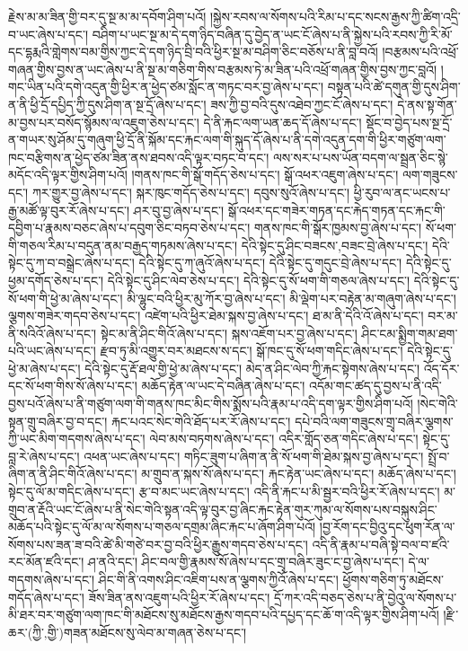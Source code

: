 རྗེས་མ་མ་ཟིན་གྱི་བར་དུ་སྔ་མ་མ་དབོག་ཤིག་པའོ། །སྐྱེས་རབས་ལ་སོགས་པའི་རིམ་པ་དང་སངས་རྒྱས་ཀྱི་ཚིག་འདྲི་བ་ཡང་ཞེས་པ་དང་། བཤིག་པ་ཡང་སྔ་མ་དེ་དག་ཉིད་བཞིན་དུ་བྱེད་ན་ཡང་ངོ་ཞེས་པ་ནི་སྐྱེས་པའི་རབས་ཀྱི་རི་མོ་དང་དྷརྨའི་གླེགས་བམ་གྱིས་ཀྱང་དེ་དག་ཉིད་བྲི་བའི་ཕྱིར་སྔ་མ་བཤིག་ཅིང་བཅོས་པ་ནི་བླ་བའོ། །བརྩམས་པའི་འཕྲོ་གཞན་གྱིས་བྱས་ན་ཡང་ཞེས་པ་ནི་སྔ་མ་གཅིག་གིས་བརྩམས་ཏེ་མ་ཟིན་པའི་འཕྲོ་གཞན་གྱིས་བྱས་ཀྱང་བླའོ། །གང་ཡིན་པའི་དགེ་འདུན་གྱི་ཕྱིར་ན་ཕྱེད་ཙམ་སློང་ན་གཏང་བར་བྱ་ཞེས་པ་དང་། བསྟན་པའི་ཚེ་དགུན་གྱི་དུས་ཤིག་ན་ནི་ཕྱི་དྲོ་དཔྱིད་ཀྱི་དུས་ཤིག་ན་སྔ་དྲོ་ཞེས་པ་དང་། ཟས་ཀྱི་བྱ་བའི་དུས་འཐེབ་ཀྱང་ངོ་ཞེས་པ་དང་། དེ་ནས་སྟ་གོན་མ་བྱས་པར་བསོད་སྙོམས་ལ་འཇུག་ཅེས་པ་དང་། དེ་ནི་རྐང་ལག་ཡན་ཆད་དོ་ཞེས་པ་དང་། སྡོང་བ་བྱེད་པས་སྔ་དྲོ་ན་གཡར་སུ་ཤོམ་དུ་གཞུག་ཕྱི་དྲོ་ནི་སྐོམ་དང་རྐང་ལག་གི་སྐུད་དོ་ཞེས་པ་ནི་དགེ་འདུན་དག་གི་ཕྱིར་གཙུག་ལག་ཁང་བརྩིགས་ན་ཕྱེད་ཙམ་ཟིན་ནས་ཐབས་འདི་ལྟར་བཏང་བ་དང་། ལས་སར་པ་པས་ཡོན་བདག་ལ་སྦྲན་ཅིང་སྙེ་མདོང་འདི་ལྟར་གྱིས་ཤིག་པའོ། །གནས་ཁང་གི་སྒོ་གདོད་ཅེས་པ་དང་། སྒོ་འཕར་འཇུག་ཞེས་པ་དང་། ལག་གཟུངས་དང་། ཀར་གྱུར་བྱ་ཞེས་པ་དང་། སྐར་ཁུང་གདོད་ཅེས་པ་དང་། དབུས་སུའོ་ཞེས་པ་དང་། ཕྱི་རུབ་ལ་ནང་ཡངས་པ་རྒྱ་མཚོ་ལྟ་བུར་རོ་ཞེས་པ་དང་། ཤར་བུ་བྱ་ཞེས་པ་དང་། སྒོ་འཕར་དང་གཟེར་གཏན་དང་རྐེད་གཏན་དང་རྐང་གི་དབྱིག་པ་རྣམས་བཅང་ཞེས་པ་དབུག་ཅིང་བཏབ་ཅེས་པ་དང་། གནས་ཁང་གི་སྒོར་ཁྱམས་བྱ་ཞེས་པ་དང་། སོ་ཕག་གི་གཅལ་རིམ་པ་བདུན་ནམ་བརྒྱད་གཏམས་ཞེས་པ་དང་། དེའི་སྟེང་དུ་ཤིང་{བཟངས་,བཟང་}བྲེ་ཞེས་པ་དང་། དེའི་སྟེང་དུ་ཀ་བ་བསྒྲེང་ཞེས་པ་དང་། དེའི་སྟེང་དུ་ཀ་ཞུའོ་ཞེས་པ་དང་། དེའི་སྟེང་དུ་གདུང་བྲེ་ཞེས་པ་དང་། དེའི་སྟེང་དུ་ཕྱམ་དགོད་ཅེས་པ་དང་། དེའི་སྟེང་དུ་ཤིང་ལེབ་ཅེས་པ་དང་། དེའི་སྟེང་དུ་སོ་ཕག་གི་གཅལ་ཞེས་པ་དང་། དེའི་སྟེང་དུ་སོ་ཕག་གི་ཕྱེ་མ་ཞེས་པ་དང་། མི་ལྷུང་བའི་ཕྱིར་མུ་ཀོར་བྱ་ཞེས་པ་དང་། མི་ལྡེག་པར་བརྟེན་མ་གཞུག་ཞེས་པ་དང་། ལྕགས་གཟེར་གདབ་ཅེས་པ་དང་། འཛེག་པའི་ཕྱིར་ཐེམ་སྐས་བྱ་ཞེས་པ་དང་། ཐ་མ་ནི་དེའི་འོ་ཞེས་པ་དང་། བར་མ་ནི་སའིའོ་ཞེས་པ་དང་། སྟེང་མ་ནི་ཤིང་གིའོ་ཞེས་པ་དང་། སྐས་འཇོག་པར་བྱ་ཞེས་པ་དང་། ཤིང་ངམ་སྨྱིག་གམ་ཐག་པའི་ཡང་ཞེས་པ་དང་། རྫབ་ཏུ་མི་འགྱུར་བར་མཐངས་ས་དང་། སྒོ་ཁང་དུ་སོ་ཕག་གདིང་ཞེས་པ་དང་། དེའི་སྟེང་དུ་ཕྱེ་མ་ཞེས་པ་དང་། དེའི་སྟེང་དུ་རྡོ་ཐལ་གྱི་ཕྱེ་མ་ཞེས་པ་དང་། མེད་ན་ཤིང་ལེབ་ཀྱི་རྐང་སྟེགས་ཞེས་པ་དང་། འོད་དོར་དང་སོ་ཕག་གིས་སོ་ཞེས་པ་དང་། མཆོད་རྟེན་ལ་ཡང་དེ་བཞིན་ཞེས་པ་དང་། འདོམ་གང་ཚད་དུ་བྱས་པ་ནི་འདི་བྱས་པའོ་ཞེས་པ་ནི་གཙུག་ལག་གི་གནས་ཁང་མིང་གིས་སྨོས་པའི་རྣམ་པ་འདི་དག་ལྟར་གྱིས་ཤིག་པའོ། །སེང་གེའི་སྟན་གྲུ་བཞིར་བྱ་བ་དང་། རྐང་པའང་སེང་གེའི་ཐོད་པར་རོ་ཞེས་པ་དང་། དཔེ་བའི་ལག་གཟུངས་གྲྭ་བཞིར་ལྕགས་ཀྱི་ཡང་མིག་གདགས་ཞེས་པ་དང་། ལེབ་མས་བཏགས་ཞེས་པ་དང་། འདིར་གློད་ཅན་གདིང་ཞེས་པ་དང་། སྟེང་དུ་བླ་རེ་ཞེས་པ་དང་། འཕན་ཡང་ཞེས་པ་དང་། གཏིང་ཟུག་པ་ཞིག་ན་ནི་སོ་ཕག་གི་ཐེམ་སྐས་བྱ་ཞེས་པ་དང་། སྤྲོ་བ་ཞིག་ན་ནི་ཤིང་གིའོ་ཞེས་པ་དང་། མ་གྲུབ་ན་སྐས་སོ་ཞེས་པ་དང་། རྐང་རྟེན་ཡང་ཞེས་པ་དང་། མཆོད་ཞེས་པ་དང་། སྟེང་དུ་ལོ་མ་གདིང་ཞེས་པ་དང་། རྩ་བ་མང་ཡང་ཞེས་པ་དང་། འདི་ནི་རྐང་པ་མི་སྦྱར་བའི་ཕྱིར་རོ་ཞེས་པ་དང་། མ་གྲུབ་ན་རྡོའི་ཡང་ངོ་ཞེས་པ་ནི་སེང་གེའི་སྟན་འདི་ལྟ་བུར་བྱ་ཞིང་རྐང་རྟེན་གུར་ཀུམ་ལ་སོགས་པས་བསྐུས་ཤིང་མཆོད་པའི་སྟེང་དུ་ལོ་མ་ལ་སོགས་པ་གཅལ་དགྲམ་ཞིང་རྐང་པ་ཞོག་ཤིག་པའོ། །བྱ་རོག་དང་བྱིའུ་དང་ཕུག་རོན་ལ་སོགས་པས་ཟན་ཟ་བའི་ཚེ་མི་གཙེ་བར་བྱ་བའི་ཕྱིར་རྒྱུས་གདབ་ཅེས་པ་དང་། འདི་ནི་རྣམ་པ་བཞི་སྟེ་བལ་བ་ཛའི་རང་མོན་ཛའི་དང་། ཤ་ནའི་དང་། ཤིང་བལ་གྱི་རྣམས་སོ་ཞེས་པ་དང་གྲྭ་བཞིར་ཟུང་ང་བྱ་ཞེས་པ་དང་། དེ་ལ་གདགས་ཞེས་པ་དང་། ཤིང་གི་ནི་འགས་ཤིང་འཇིག་པས་ན་ལྕགས་ཀྱིའོ་ཞེས་པ་དང་། ཕྱོགས་གཅིག་ཏུ་མཐོངས་གདོད་ཞེས་པ་དང་། ཟོས་ཟིན་ནས་འཇུག་པའི་ཕྱིར་རོ་ཞེས་པ་དང་། དྲོ་ཀར་འདི་བཅད་ཅེས་པ་ནི་བྱེའུ་ལ་སོགས་པ་མི་ཐར་བར་གཙུག་ལག་ཁང་གི་མཐོངས་སུ་མཐོངས་རྒྱས་གདབ་པའི་དཔྱད་དང་ཆོ་ག་འདི་ལྟར་གྱིས་ཤིག་པའོ། །རྫི་ཆར་(ཀྱི་‚གྱི་)གཟན་མཐོངས་སུ་ལེབ་མ་གཞན་ཅེས་པ་དང་། 
